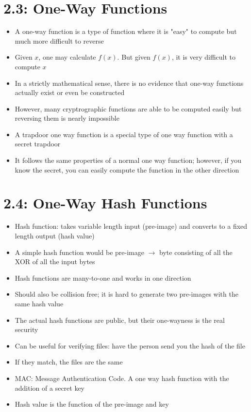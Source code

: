 \documentclass[]{article}
\begin{document}
\section{2.3: One-Way Functions}
\begin{itemize}
    \item A one-way function is a type of function where it is "easy" to compute but much more difficult to reverse
    \item Given $x$, one may calculate $f(x)$. But given $f(x)$, it is very difficult to compute $x$
    \item In a strictly mathematical sense, there is no evidence that one-way functions actually exist or even be constructed
    \item However, many cryptrographic functions are able to be computed easily but reversing them is nearly impossible
    \item A trapdoor one way function is a special type of one way function with a secret trapdoor
    \item It follows the same properties of a normal one way function; however, if you know the secret, you can easily compute the function in the other direction
\end{itemize}
\section{2.4: One-Way Hash Functions}
\begin{itemize}
    \item Hash function: takes variable length input (pre-image) and converts to a fixed length output (hash value)
    \item A simple hash function would be pre-image $\rightarrow$ byte consisting of all the XOR of all the input bytes
    \item Hash functions are many-to-one and works in one direction
    \item Should also be collision free; it is hard to generate two pre-images with the same hash value
    \item The actual hash functions are public, but their one-wayness is the real security
    \item Can be useful for verifying files: have the person send you the hash of the file
    \item If they match, the files are the same
    \item MAC: Message Authentication Code. A one way hash function with the addition of a secret key
    \item Hash value is the function of the pre-image and key
\end{itemize}
\end{document}

